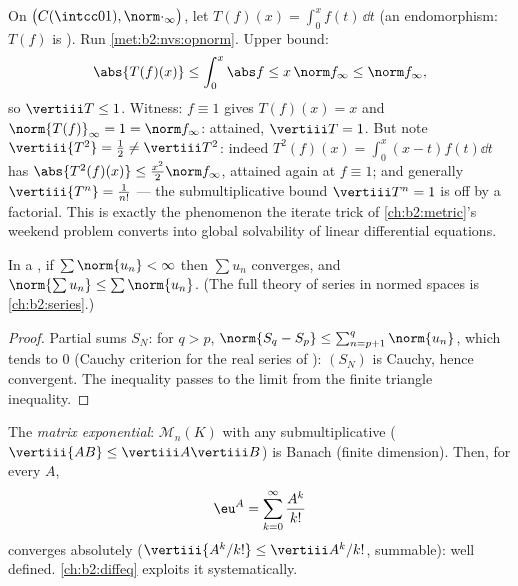\begin{example}\label{ex:b2:nvs:integrationnorm}
On $\bigl(C(\intcc01), \norm\cdot_\infty\bigr)$, let $T(f)(x) =
\int_0^x f(t)\,\dd t$ (an endomorphism: $T(f)$ is ).
Run \cref{met:b2:nvs:opnorm}. Upper bound:
\[
\abs{T(f)(x)} \leq \int_0^x\abs f \leq x\,\norm f_\infty \leq
\norm f_\infty ,
\]
so $\vertiii T \leq 1$. Witness: $f \equiv 1$ gives $T(f)(x) =
x$ and $\norm{T(f)}_\infty = 1 = \norm f_\infty$: attained,
$\vertiii T = 1$. But note $\vertiii{T^2} = \frac12 \neq
\vertiii T^2$: indeed $T^2(f)(x) = \int_0^x(x - t)f(t)\dd t$ has
$\abs{T^2(f)(x)} \leq \frac{x^2}2\norm f_\infty$, attained again
at $f \equiv 1$; and generally $\vertiii{T^n} = \frac1{n!}$ ---
the submultiplicative bound $\vertiii T^n = 1$ is off by a
factorial. This is exactly the phenomenon the iterate trick of
\cref{ch:b2:metric}'s weekend problem converts into global
solvability of linear differential equations.
\end{example}

\begin{theorem}\label{thm:b2:nvs:absoluteconvergence}
In a , if $\sum \norm{u_n} < \infty$ then $\sum u_n$
converges, and $\norm{\sum u_n} \leq \sum\norm{u_n}$. (The full
theory of series in normed spaces is \cref{ch:b2:series}.)
\end{theorem}

\begin{proof}
Partial sums $S_N$: for $q > p$, $\norm{S_q - S_p} \leq
\sum_{n=p+1}^{q}\norm{u_n}$, which tends to $0$ (Cauchy criterion
for the real series of ): $(S_N)$ is Cauchy, hence convergent.
The inequality passes to the limit from the finite triangle
inequality.
\end{proof}

\begin{example}\label{ex:b2:nvs:matrixexp}
The \emph{matrix exponential}:
$\mathcal{M}_n(K)$ with any submultiplicative  ($\vertiii{AB}
\leq \vertiii A \vertiii B$) is Banach (finite dimension). Then, for
every $A$,
\[
\eu^A = \sum_{k=0}^{\infty} \frac{A^k}{k!}
\]
converges absolutely ($\vertiii{A^k/k!} \leq \vertiii A^k /k!$,
summable): well defined. \cref{ch:b2:diffeq} exploits it
systematically.
\end{example}

